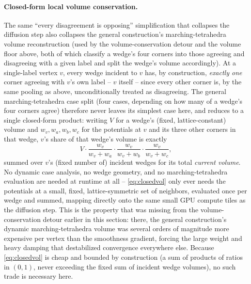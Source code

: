 \documentclass[journal]{vgtc}                     %
\begin{document}
\paragraph{Closed-form local volume conservation.} The same ``every disagreement is opposing'' simplification that collapses the diffusion step also collapses the general construction's marching-tetrahedra volume reconstruction (used by the volume-conservation detour and the volume floor above, both of which classify a wedge's four corners into those agreeing and disagreeing with a given label and split the wedge's volume accordingly). At a single-label vertex $v$, every wedge incident to $v$ has, by construction, \emph{exactly one} corner agreeing with $v$'s own label -- $v$ itself -- since every other corner is, by the same pooling as above, unconditionally treated as disagreeing. The general marching-tetrahedra case split (four cases, depending on how many of a wedge's four corners agree) therefore never leaves its simplest case here, and reduces to a single closed-form product: writing $V$ for a wedge's (fixed, lattice-constant) volume and $w_v,w_a,w_b,w_c$ for the potentials at $v$ and its three other corners in that wedge, $v$'s share of that wedge's volume is exactly
\begin{equation} \label{eq:closedvol}
	V \cdot \frac{w_v}{w_v+w_a} \cdot \frac{w_v}{w_v+w_b} \cdot \frac{w_v}{w_v+w_c} ,
\end{equation}
summed over $v$'s (fixed number of) incident wedges for its total \emph{current volume}. No dynamic case analysis, no wedge geometry, and no marching-tetrahedra evaluation are needed at runtime at all -- \cref{eq:closedvol} only ever needs the potentials at a small, fixed, lattice-symmetric set of neighbors, evaluated once per wedge and summed, mapping directly onto the same small GPU compute tiles as the diffusion step. This is the property that was missing from the volume-conservation detour earlier in this section: there, the general construction's dynamic marching-tetrahedra volume was several orders of magnitude more expensive per vertex than the smoothness gradient, forcing the large weight and heavy damping that destabilized convergence everywhere else. Because \cref{eq:closedvol} is cheap and bounded by construction (a sum of products of ratios in $(0,1)$, never exceeding the fixed sum of incident wedge volumes), no such trade is necessary here.
\end{document}
